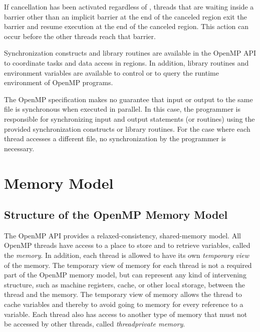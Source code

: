 If cancellation has been activated regardless of , 
threads that are
waiting inside a barrier other than an implicit barrier at the end of the canceled region 
exit the barrier and resume execution at the end of the canceled region. This action can 
occur before the other threads reach that barrier.

Synchronization constructs and library routines are available in the OpenMP API to 
coordinate tasks and data access in  regions. In addition, library routines and
environment variables are available to control or to query the runtime environment of 
OpenMP programs.

The OpenMP specification makes no guarantee that input or output to the same file is 
synchronous when executed in parallel. In this case, the programmer is responsible for 
synchronizing input and output statements (or routines) using the provided 
synchronization constructs or library routines. For the case where each thread accesses a 
different file, no synchronization by the programmer is necessary.








\section{Memory Model}
\label{sec:Memory Model}
\subsection{Structure of the OpenMP Memory Model}
\label{subsec:Structure of the OpenMP Memory Model}
The OpenMP API provides a relaxed-consistency, shared-memory model. All OpenMP
threads have access to a place to store and to retrieve variables, 
called the \emph{memory}. In
addition, each thread is allowed to have its own \emph{temporary view} of the memory. The
temporary view of memory for each thread is not a required part of the OpenMP
memory model, but can represent any kind of intervening structure, such as machine
registers, cache, or other local storage, between the thread and the memory. The
temporary view of memory allows the thread to cache variables and thereby to avoid
going to memory for every reference to a variable. Each thread also has access to
another type of memory that must not be accessed by other threads, 
called \emph{threadprivate memory}.

